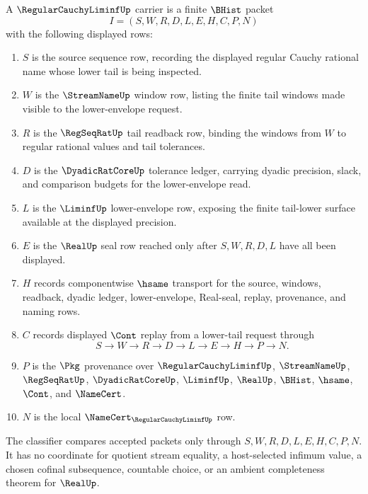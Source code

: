 \begin{definition}
\label{def:regular-cauchy-liminf-carrier}
A $\RegularCauchyLiminfUp$ carrier is a finite $\BHist$ packet
$$
I=(S,W,R,D,L,E,H,C,P,N)
$$
with the following displayed rows:
\begin{enumerate}
\item $S$ is the source sequence row, recording the displayed regular Cauchy rational name whose lower tail is being inspected.
\item $W$ is the $\StreamNameUp$ window row, listing the finite tail windows made visible to the lower-envelope request.
\item $R$ is the $\RegSeqRatUp$ tail readback row, binding the windows from $W$ to regular rational values and tail tolerances.
\item $D$ is the $\DyadicRatCoreUp$ tolerance ledger, carrying dyadic precision, slack, and comparison budgets for the lower-envelope read.
\item $L$ is the $\LiminfUp$ lower-envelope row, exposing the finite tail-lower surface available at the displayed precision.
\item $E$ is the $\RealUp$ seal row reached only after $S,W,R,D,L$ have all been displayed.
\item $H$ records componentwise $\hsame$ transport for the source, windows, readback, dyadic ledger, lower-envelope, Real-seal, replay, provenance, and naming rows.
\item $C$ records displayed $\Cont$ replay from a lower-tail request through
$$
S \longrightarrow W \longrightarrow R \longrightarrow D \longrightarrow L \longrightarrow E \longrightarrow H \longrightarrow P \longrightarrow N .
$$
\item $P$ is the $\Pkg$ provenance over $\RegularCauchyLiminfUp$, $\StreamNameUp$, $\RegSeqRatUp$, $\DyadicRatCoreUp$, $\LiminfUp$, $\RealUp$, $\BHist$, $\hsame$, $\Cont$, and $\NameCert$.
\item $N$ is the local $\NameCert_{\RegularCauchyLiminfUp}$ row.
\end{enumerate}
The classifier compares accepted packets only through $S,W,R,D,L,E,H,C,P,N$. It has no coordinate for quotient stream equality, a host-selected infimum value, a chosen cofinal subsequence, countable choice, or an ambient completeness theorem for $\RealUp$.
\end{definition}

